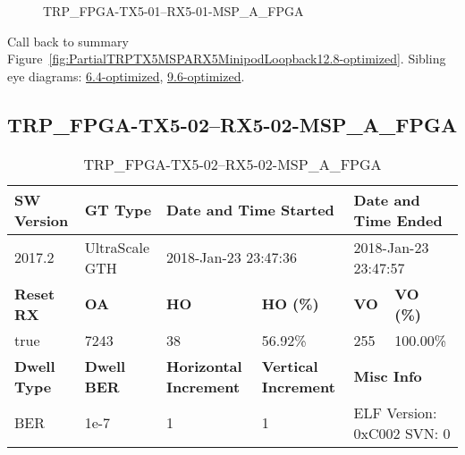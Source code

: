 \begin{figure}[h]
\caption{TRP\_FPGA-TX5-01--RX5-01-MSP\_A\_FPGA} \label{fig:TRPFPGATX501RX501MSPAFPGA12.8-optimized}
\end{figure}

Call back to summary Figure~\ref{fig:PartialTRPTX5MSPARX5MinipodLoopback12.8-optimized}.
Sibling eye diagrams: \hyperref[sec:TRPFPGATX501RX501MSPAFPGA6.4-optimized]{6.4-optimized}, \hyperref[sec:TRPFPGATX501RX501MSPAFPGA9.6-optimized]{9.6-optimized}.

\clearpage
\newpage


\subsection{TRP\_FPGA-TX5-02--RX5-02-MSP\_A\_FPGA}\label{sec:TRPFPGATX502RX502MSPAFPGA12.8-optimized}

\begin{table}[h]
\centering
\caption{TRP\_FPGA-TX5-02--RX5-02-MSP\_A\_FPGA}
\label{tab:TRPFPGATX502RX502MSPAFPGA12.8-optimized}
\begin{tabular}{@{}|l|l|l|l|l|l|@{}}
\toprule
\textbf{SW Version}                & \textbf{GT Type}   & \multicolumn{2}{l|}{\textbf{Date and Time Started}}            & \multicolumn{2}{l|}{\textbf{Date and Time Ended}}        \\ \midrule
2017.2                       & UltraScale GTH          & \multicolumn{2}{l|}{2018-Jan-23 23:47:36}                   & \multicolumn{2}{l|}{2018-Jan-23 23:47:57}               \\ \midrule
\textbf{Reset RX}                  & \textbf{OA} & \textbf{HO}   & \textbf{HO (\%)} & \textbf{VO} & \textbf{VO (\%)} \\ \midrule
true & 7243        & 38          & 56.92\%        & 255        & 100.00\%       \\ \midrule
\textbf{Dwell Type}                & \textbf{Dwell BER} & \textbf{Horizontal Increment} & \textbf{Vertical Increment}    & \multicolumn{2}{l|}{\textbf{Misc Info}}                  \\ \midrule
BER                            & 1e-7        & 1        & 1           & \multicolumn{2}{l|}{ELF Version: 0xC002 SVN: 0}                         \\ \bottomrule
\end{tabular}
\end{table}

